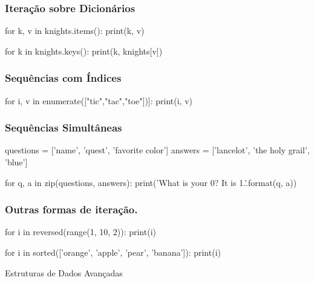 \documentclass[aspectratio=169,14pt]{beamer}
\begin{document}
\begin{frame}[fragile]
    \frametitle{Iteração sobre Dicionários}
    \begin{python}
        for k, v in knights.items():
             print(k, v)

        for k in knights.keys():
             print(k, knights[v])
    \end{python}
\end{frame}

\begin{frame}[fragile]
    \frametitle{Sequências com Índices}
    \begin{python}
        for i, v in enumerate(["tic","tac","toe"])]:
             print(i, v)
    \end{python}
\end{frame}

\begin{frame}[fragile]
    \frametitle{Sequências Simultâneas}
    \begin{python}
         questions = ['name', 'quest', 'favorite color']
         answers = ['lancelot', 'the holy grail', 'blue']

         for q, a in zip(questions, answers):
              print('What is your {0}?  It is {1}.'.format(q, a))
    \end{python}
\end{frame}

\begin{frame}[fragile]
    \frametitle{Outras formas de iteração.}
    \begin{python}
        for i in reversed(range(1, 10, 2)):
            print(i)

        for i in sorted(['orange', 'apple', 'pear', 'banana']):
            print(i)
    \end{python}
\end{frame}

\begin{frame}
    \begin{center}
        \Huge Estruturas de Dados Avançadas
    \end{center}
\end{frame}
\end{document}
